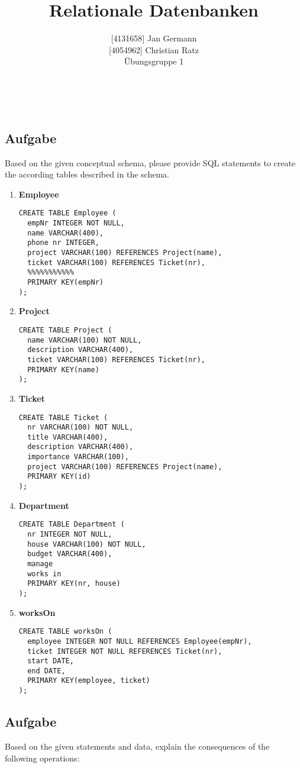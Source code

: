 \documentclass[11pt,a4paper,DIV=9]{scrartcl}
\author{{[}4131658{]} Jan Germann \\{[}4054962{]} Christian Ratz\\Übungsgruppe 1}
\title{Relationale Datenbanken}
\newcounter{temp}
\newcommand{\aufgabe}[1]{
  \setcounter{temp}{\value{subsection}}
  \setcounter{subsection}{#1}
  \addtocounter{subsection}{-1}
  \subsection{Aufgabe}
  \setcounter{subsection}{\value{temp}}
}
\renewcommand{\author}[1]{\renewcommand{\author}{#1}}
\renewcommand{\title}[1]{\renewcommand{\title}{#1}}
\newcommand{\makehomeworktitle}{
  \begin{minipage}[t]{6.5cm}
    \sf{\author}
  \end{minipage}
  \begin{minipage}[t]{6.5cm}
    \begin{flushright}
      \sf{\title\\\today}
    \end{flushright}
  \end{minipage}
  \\[0.2cm]
  \begin{center}
    \sf{
      \color{blue}{
        \LARGE{Aufgabenblatt \blattnr}
      }
    }
  \end{center}
  \vspace{0.1cm}
}
\begin{document}
\makehomeworktitle
   \aufgabe{1}
   Based on the given conceptual schema, please provide SQL statements to create the according tables described in the schema.
   \begin{enumerate}
   \item \textbf{Employee}
\begin{lstlisting}
CREATE TABLE Employee (
  empNr INTEGER NOT NULL,
  name VARCHAR(400),
  phone nr INTEGER,
  project VARCHAR(100) REFERENCES Project(name),
  ticket VARCHAR(100) REFERENCES Ticket(nr),
  %%%%%%%%%%%
  PRIMARY KEY(empNr)
);
\end{lstlisting}
    \item \textbf{Project}
\begin{lstlisting}
CREATE TABLE Project (
  name VARCHAR(100) NOT NULL, 
  description VARCHAR(400), 
  ticket VARCHAR(100) REFERENCES Ticket(nr),
  PRIMARY KEY(name)
);
    \end{lstlisting}
    \item \textbf{Ticket}
\begin{lstlisting}
CREATE TABLE Ticket (
  nr VARCHAR(100) NOT NULL, 
  title VARCHAR(400), 
  description VARCHAR(400),
  importance VARCHAR(100),
  project VARCHAR(100) REFERENCES Project(name),
  PRIMARY KEY(id)
);
\end{lstlisting}
    \item \textbf{Department}
\begin{lstlisting}
CREATE TABLE Department (
  nr INTEGER NOT NULL, 
  house VARCHAR(100) NOT NULL,
  budget VARCHAR(400),
  manage
  works in
  PRIMARY KEY(nr, house)
);
\end{lstlisting}
    \item \textbf{worksOn}
\begin{lstlisting}
CREATE TABLE worksOn (
  employee INTEGER NOT NULL REFERENCES Employee(empNr),
  ticket INTEGER NOT NULL REFERENCES Ticket(nr),
  start DATE,
  end DATE,
  PRIMARY KEY(employee, ticket)
);
\end{lstlisting}	
    \end{enumerate}
   \aufgabe{2}
   Based on the given statements and data, explain the consequences of the following operations:
\end{document}
